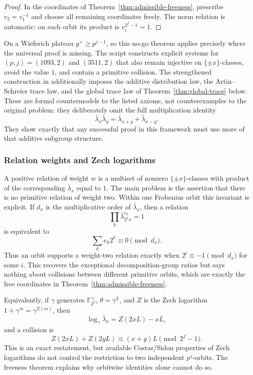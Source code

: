 \documentclass[a4paper]{article}
\newcommand{\F}{\mathbb{F}}
\begin{document}
\begin{proof}
	In the coordinates of Theorem~\ref{thm:admissible-freeness}, prescribe
	$v_2=v_1^{-1}$ and choose all remaining coordinates freely.  The norm
	relation is automatic: on each orbit its product is
	$v_i^{2^{\bar f}-1}=1$.
\end{proof}

On a Wieferich plateau $g^+\geq p^{j-1}$, so this no-go theorem applies
precisely where the universal proof is missing.  The script
 constructs explicit systems
for $(p,j)=(1093,2)$ and $(3511,2)$ that also remain injective on
$\{\pm x\}$-classes, avoid the value $1$, and contain a primitive
collision.  The strengthened construction in
 additionally imposes the
additive distribution law, the Artin--Schreier trace law, and the global
trace law of Theorem~\ref{thm:global-trace} below.  These are formal
countermodels to the listed axioms, not counterexamples to the original
problem: they deliberately omit the full multiplication identity
\[
	\bar\lambda_x\bar\lambda_y
	=\bar\lambda_{x+y}+\bar\lambda_{x-y}.
\]
They show exactly that any successful proof in this framework must use
more of that additive subgroup structure.

\subsubsection{Relation weights and Zech logarithms}

A positive relation of weight $w$ is a multiset of nonzero
$\{\pm x\}$-classes with product of the corresponding
$\bar\lambda_x$ equal to $1$.  The main problem is the assertion that
there is no primitive relation of weight two.  Within one Frobenius orbit
this invariant is explicit.  If $d_x$ is the multiplicative order of
$\bar\lambda_x$, then a relation
\[
	\prod_k\bar\lambda_{2^kx}^{e_k}=1
\]
is equivalent to
\[
	\sum_ke_k2^k\equiv0\pmod{d_x}.
\]
Thus an orbit supports a weight-two relation exactly when
$2^i\equiv-1\pmod{d_x}$ for some $i$.  This recovers the exceptional
decomposition-group ratios but says nothing about collisions between
different primitive orbits, which are exactly the free coordinates in
Theorem~\ref{thm:admissible-freeness}.

Equivalently, if $\gamma$ generates $\F_{2^f}^\times$,
$\theta=\gamma^L$, and $Z$ is the Zech logarithm
$1+\gamma^m=\gamma^{Z(m)}$, then
\[
	\log_\gamma\bar\lambda_x=Z(2xL)-xL,
\]
and a collision is
\[
	Z(2xL)+Z(2yL)\equiv(x+y)L\pmod{2^f-1}.
\]
This is an exact restatement, but available Costas/Sidon properties of
Zech logarithms do not control the restriction to two independent
$p^j$-orbits.  The freeness theorem explains why orbitwise identities
alone cannot do so.
\end{document}

